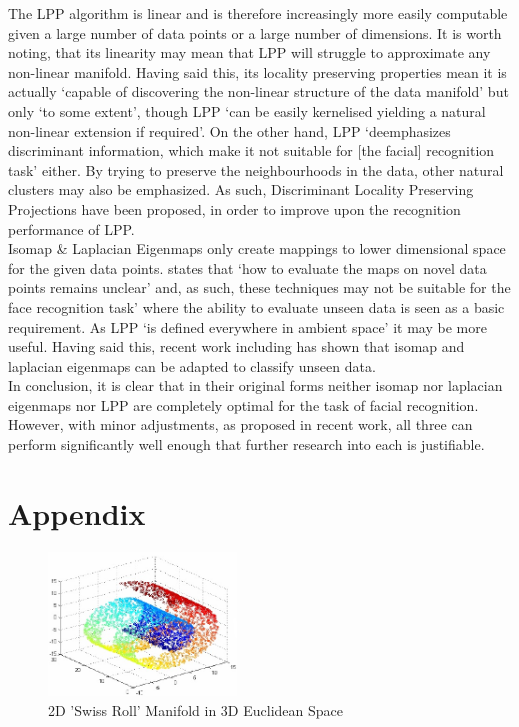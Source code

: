 \documentclass{article}
\begin{document}
The LPP algorithm is linear and is therefore increasingly more easily computable given a large number of data points or a large number of dimensions. It is worth noting, that its linearity may mean that LPP will struggle to approximate any non-linear manifold. Having said this, its locality preserving properties mean it is actually `capable of discovering the non-linear structure of the data manifold' but only `to some extent', though LPP `can be easily kernelised yielding a natural non-linear extension if required'\cite{lpp}. On the other hand, LPP `deemphasizes discriminant information, which make it not suitable for [the facial] recognition task'\cite{discriminant_lpp} either. By trying to preserve the neighbourhoods in the data, other natural clusters may also be emphasized\cite{lpp}. As such, Discriminant Locality Preserving Projections have been proposed, in order to improve upon the recognition performance of LPP\cite{discriminant_lpp}.\\

Isomap \& Laplacian Eigenmaps only create mappings to lower dimensional space for the given data points. \cite{eigenfaces} states that `how to evaluate the maps on novel data points remains unclear' and, as such, these techniques may not be suitable for the face recognition task' where the ability to evaluate unseen data is seen as a basic requirement. As LPP `is defined everywhere in ambient space' it may be more useful. Having said this, recent work including \cite{out-of-sample-extensions} has shown that isomap and laplacian eigenmaps can be adapted to classify unseen data.\\

In conclusion, it is clear that in their original forms neither isomap nor laplacian eigenmaps nor LPP are completely optimal for the task of facial recognition. However, with minor adjustments, as proposed in recent work, all three can perform significantly well enough that further research into each is justifiable. %

\newpage
{} 


\newpage
\section{Appendix}
\begin{figure}[ht!]
	\centering
	\includegraphics[width=50mm]{swissroll}
	\caption{2D 'Swiss Roll' Manifold in 3D Euclidean Space}
	\label{fig:swiss-roll}
\end{figure}
\end{document}
